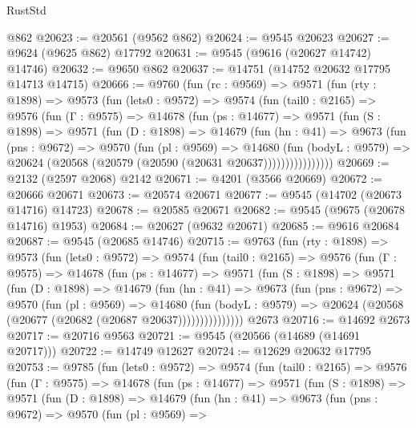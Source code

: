\begin{lexlean}{RustStd}
\begin{coremodule}
    @862
@20623 := @20561 (@9562 @862)
@20624 := @9545 @20623
@20627 := @9624 (@9625 @862) @17792
@20631 := @9545 (@9616 (@20627 @14742) @14746)
@20632 := @9650 @862
@20637 := @14751 (@14752 @20632 @17795 @14713 @14715)
@20666 := @9760
    (fun (rc : @9569) =>
    @9571
      (fun (rty : @1898) =>
      @9573
        (fun (lets0 : @9572) =>
        @9574
          (fun (tail0 : @2165) =>
          @9576
            (fun (Γ : @9575) =>
            @14678
              (fun (ps : @14677) =>
              @9571
                (fun (S : @1898) =>
                @9571
                  (fun (D : @1898) =>
                  @14679
                    (fun (hn : @41) =>
                    @9673
                      (fun (pns : @9672) =>
                      @9570
                        (fun (pl : @9569) =>
                        @14680
                          (fun (bodyL : @9579) =>
                          @20624 (@20568 (@20579 (@20590 (@20631 @20637))))))))))))))))
@20669 := @2132 (@2597 @2068) @2142
@20671 := @4201 (@3566 @20669)
@20672 := @20666 @20671
@20673 := @20574 @20671
@20677 := @9545 (@14702 (@20673 @14716) @14723)
@20678 := @20585 @20671
@20682 := @9545 (@9675 (@20678 @14716) @1953)
@20684 := @20627 (@9632 @20671)
@20685 := @9616 @20684
@20687 := @9545 (@20685 @14746)
@20715 := @9763
    (fun (rty : @1898) =>
    @9573
      (fun (lets0 : @9572) =>
      @9574
        (fun (tail0 : @2165) =>
        @9576
          (fun (Γ : @9575) =>
          @14678
            (fun (ps : @14677) =>
            @9571
              (fun (S : @1898) =>
              @9571
                (fun (D : @1898) =>
                @14679
                  (fun (hn : @41) =>
                  @9673
                    (fun (pns : @9672) =>
                    @9570
                      (fun (pl : @9569) =>
                      @14680
                        (fun (bodyL : @9579) =>
                        @20624 (@20568 (@20677 (@20682 (@20687 @20637)))))))))))))))
    @2673
@20716 := @14692 @2673
@20717 := @20716 @9563
@20721 := @9545 (@20566 (@14689 (@14691 @20717)))
@20722 := @14749 @12627
@20724 := @12629 @20632 @17795
@20753 := @9785
    (fun (lets0 : @9572) =>
    @9574
      (fun (tail0 : @2165) =>
      @9576
        (fun (Γ : @9575) =>
        @14678
          (fun (ps : @14677) =>
          @9571
            (fun (S : @1898) =>
            @9571
              (fun (D : @1898) =>
              @14679
                (fun (hn : @41) =>
                @9673
                  (fun (pns : @9672) =>
                  @9570
                    (fun (pl : @9569) =>

\end{coremodule}
\end{lexlean}
